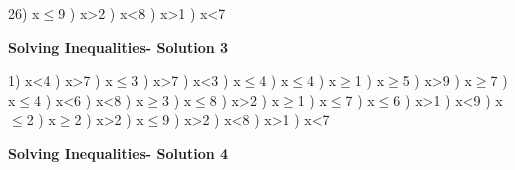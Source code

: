 \documentclass{article}%
\begin{document}
26) x$\leq$9%
) x>2%
) x<8%
) x>1%
) x<7%
\newline%
\newpage%
\large%
\begin{center}%
\textbf{Solving Inequalities- Solution 3}%
\newline%
\end{center} \normalsize%
1) x<4%
) x>7%
) x$\leq$3%
) x>7%
) x<3%
) x$\leq$4%
) x$\leq$4%
) x$\geq$1%
) x$\geq$5%
) x>9%
) x$\geq$7%
) x$\leq$4%
) x<6%
) x<8%
) x$\geq$3%
) x$\leq$8%
) x>2%
) x$\geq$1%
) x$\leq$7%
) x$\leq$6%
) x>1%
) x<9%
) x$\leq$2%
) x$\geq$2%
) x>2%
) x$\leq$9%
) x>2%
) x<8%
) x>1%
) x<7%
\newline%
\newpage%
\large%
\begin{center}%
\textbf{Solving Inequalities- Solution 4}%
\newline%
\end{center} \normalsize%
\end{document}
